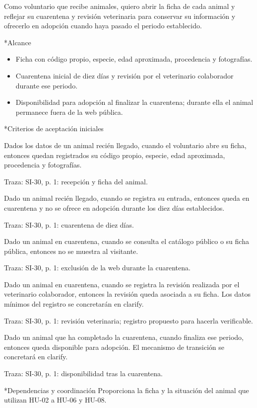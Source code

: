 \documentclass[10pt,a4paper]{article}
\makeatletter
\newcommand{\apartado}{\@startsection{subsection}{2}{\z@}{7pt}{3pt}{\normalfont\normalsize\bfseries\color{verde}}*}
\newenvironment{criterios}{\begin{description}[style=nextline,leftmargin=0pt,labelsep=0pt,font=\bfseries\color{verde},itemsep=5pt,topsep=3pt,parsep=0pt]}{\end{description}}
\newcommand{\historia}[1]{\begingroup\setlength{\fboxsep}{10pt}\colorbox{suave}{\parbox{\dimexpr\linewidth-20pt\relax}{#1}}\endgroup}
\newcommand{\traza}[1]{{\footnotesize\color{gris}Traza: SI-30, #1.}}
\newcommand{\HU}[1]{\mbox{HU-#1}}
\makeatother
\begin{document}
\historia{Como voluntario que recibe animales, quiero abrir la ficha de cada animal y reflejar su cuarentena y revisión veterinaria para conservar su información y ofrecerlo en adopción cuando haya pasado el periodo establecido.}
\apartado{Alcance}
\begin{itemize}
\item Ficha con código propio, especie, edad aproximada, procedencia y fotografías.
\item Cuarentena inicial de diez días y revisión por el veterinario colaborador durante ese periodo.
\item Disponibilidad para adopción al finalizar la cuarentena; durante ella el animal permanece fuera de la web pública.
\end{itemize}
\apartado{Criterios de aceptación iniciales}
\begin{criterios}
\item[CA-01-01] Dados los datos de un animal recién llegado, cuando el voluntario abre su ficha, entonces quedan registrados su código propio, especie, edad aproximada, procedencia y fotografías.\par\traza{p. 1: recepción y ficha del animal}
\item[CA-01-02] Dado un animal recién llegado, cuando se registra su entrada, entonces queda en cuarentena y no se ofrece en adopción durante los diez días establecidos.\par\traza{p. 1: cuarentena de diez días}
\item[CA-01-03] Dado un animal en cuarentena, cuando se consulta el catálogo público o su ficha pública, entonces no se muestra al visitante.\par\traza{p. 1: exclusión de la web durante la cuarentena}
\item[CA-01-04] Dado un animal en cuarentena, cuando se registra la revisión realizada por el veterinario colaborador, entonces la revisión queda asociada a su ficha. Los datos mínimos del registro se concretarán en clarify.\par\traza{p. 1: revisión veterinaria; registro propuesto para hacerla verificable}
\item[CA-01-05] Dado un animal que ha completado la cuarentena, cuando finaliza ese periodo, entonces queda disponible para adopción. El mecanismo de transición se concretará en clarify.\par\traza{p. 1: disponibilidad tras la cuarentena}
\end{criterios}
\apartado{Dependencias y coordinación}
Proporciona la ficha y la situación del animal que utilizan \HU{02} a \HU{06} y \HU{08}.
\end{document}
